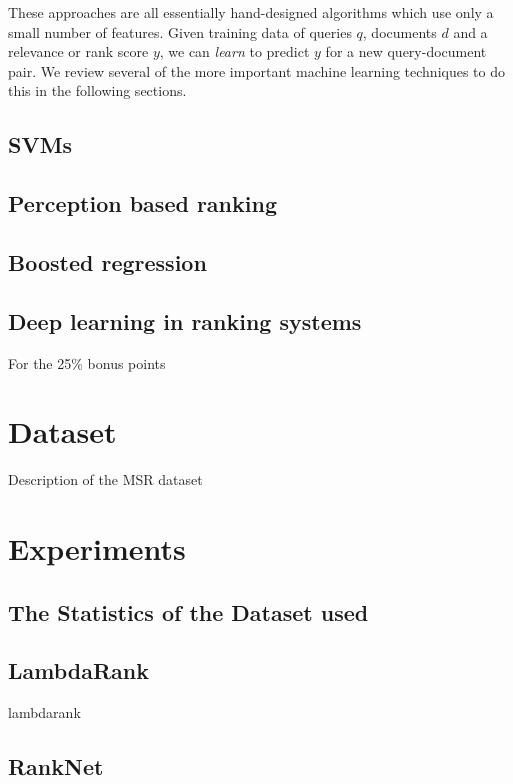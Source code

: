 \documentclass[english]{article}
\theoremstyle{definition}
\begin{document}
These approaches are all essentially hand-designed algorithms which use only a small number of features.  Given training data of queries $q$, documents $d$ and a relevance or rank score $y$, we can \textit{learn} to predict $y$ for a new query-document pair.  We review several of the more important machine learning techniques to do this in the following sections.

\subsection{SVMs}

\subsection{Perception based ranking}

\subsection{Boosted regression}

\subsection{Deep learning in ranking systems}

For the 25\% bonus points

\section{Dataset}

Description of the MSR dataset

\section{Experiments}

\subsection{The Statistics of the Dataset used}

\subsection{LambdaRank}

lambdarank

\subsection{RankNet}
\end{document}
